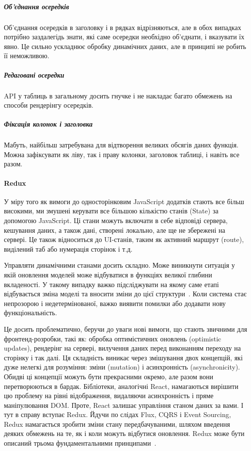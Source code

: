 \subparagraph{Об'єднання осередків}
Об'єднання осередків в заголовку і в рядках відрізняються, але в обох випадках потрібно заздалегідь знати, які саме осередки необхідно об'єднати, і вказувати їх явно. Це сильно ускладнює обробку динамічних даних, але в принципі не робить її неможливою.

\subparagraph{Редаговані осередки}
API у таблиць в загальному досить гнучке і не накладає багато обмежень на способи рендерінгу осередків. 

\subparagraph{Фіксація колонок і заголовка}
Мабуть, найбільш затребувана для відтворення великих обсягів даних функція. Можна зафіксувати як ліву, так і праву колонки, заголовок таблиці, і навіть все разом.

\paragraph{Redux}

У міру того як вимоги до односторінковим JavaScript додатків стають все більш високими, ми змушені керувати все більшою кількістю станів (State) за допомогою JavaScript. Ці стани можуть включати в себе відповіді сервера, кешування даних, а також дані, створені локально, але ще не збережені на сервері. Це також відноситься до UI-станів, таким як активний маршрут (route), виділений таб або нумерація сторінок і т.д.

Управляти динамічними станами досить складно. Може виникнути ситуація у якій оновлення моделей може відбуватися в функціях великої глибини вкладеності. У такому випадку важко підсліджувати на якому саме етапі відбувається зміна моделі та вносити зміни до цієї структури~\cite{robinwieruch2018}. Коли система стає непрозорою і недетермінованої, важко виявити помилки або додавати нову функціональність.

Це досить проблематично, беручи до уваги нові вимоги, що стають звичними для фронтенд-розробки, такі як: обробка оптимістичних оновлень (optimistic updates), рендерінг на сервері, вилучення даних перед виконанням переходу на сторінку і так далі.  Ця складність виникає через змішування двох концепцій, які дуже нелегкі для розуміння: зміни (mutation) і асинхронність (asynchronicity). Обидві ці концепції можуть бути прекрасними окремо, але разом вони перетворюються в бардак. Бібліотеки, аналогічні React, намагаються вирішити цю проблему на рівні відображення, видаляючи асинхронність і пряме маніпулювання DOM. Проте, React залишає управління станом даних за вами. І тут в справу вступає Redux.
Йдучи по слідах Flux, CQRS і Event Sourcing, Redux намагається зробити зміни стану передбачуваними, шляхом введення деяких обмежень на те, як і коли можуть відбутися оновлення. Redux може бути описаний трьома фундаментальними принципами~\cite{davidgeary2019}.

